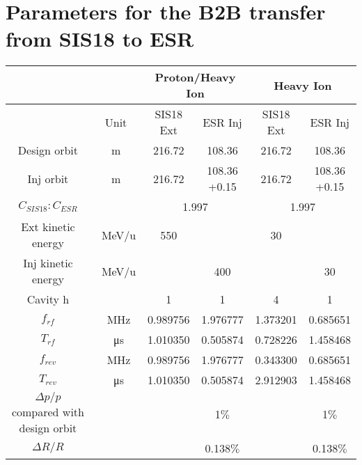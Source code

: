 \newpage
\section{Parameters for the B2B transfer from SIS18 to ESR}
\label{sec:18toESR}



% 
    \begin{longtable}{ | c | c | c | c | c | c |}
    \hline
		\rowcolor[gray]{0.8}
     	 &  & \multicolumn{2}{c|}{Proton/Heavy Ion} & \multicolumn{2}{c|}{Heavy Ion} \\ \hline
		 & Unit &	SIS18 Ext & ESR Inj & SIS18 Ext &	ESR Inj\\ \hline
Design orbit &	m &	 216.72&108.36&	216.72&108.36	\\ \hline
Inj orbit &	m &	 216.72&\tabincell{c}{108.36\\+0.15}&	216.72&\tabincell{c}{108.36\\+0.15}	\\ \hline
$C_{SIS18}:C_{ESR}$&	&	\multicolumn{2}{c|}{1.997}&\multicolumn{2}{c|}{1.997}	\\ \hline
\tabincell{c}{Ext kinetic\\ energy}&	\SI{}{\MeV/\atomicmassunit}&	550 & &30&	\\ \hline
\tabincell{c}{Inj kinetic\\ energy}&	\SI{}{\MeV/\atomicmassunit}&	&400&	&30	\\ \hline
Cavity h&	&1&1&4&1	\\ \hline
$f_{rf}$&\SI{}{\MHz}&	0.989756&1.976777&1.373201&0.685651	\\ \hline$T_{rf}$&\SI{}{\us}&	1.010350&0.505874&0.728226&1.458468\\ \hline
$f_{rev}$&\SI{}{\MHz}&	0.989756&1.976777&0.343300&0.685651\\ \hline
$T_{rev}$&\SI{}{\us}&	1.010350&0.505874&2.912903&1.458468\\ \hline
\tabincell{c}{$\Delta p/p$ compared \\with design orbit}&	&&1$\%$&&1$\%$\\ \hline
$\Delta R/R$&	&&0.138$\%$&&0.138$\%$\\ \hline

\end{longtable}
